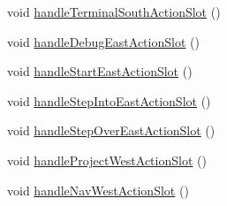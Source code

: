 \begin{DoxyCompactItemize}
\item 
void \hyperlink{class_master_actions_a3f3ec7277966d98a9fc5df5ceca1fa97}{handle\-Terminal\-South\-Action\-Slot} ()
\item 
void \hyperlink{class_master_actions_a03d0a4c989d63fd14f76ccda5893807b}{handle\-Debug\-East\-Action\-Slot} ()
\item 
void \hyperlink{class_master_actions_a24da37bce53aacd7de8d3643f273b1bd}{handle\-Start\-East\-Action\-Slot} ()
\item 
void \hyperlink{class_master_actions_a758cec03f958827f90c4393a8791e230}{handle\-Step\-Into\-East\-Action\-Slot} ()
\item 
void \hyperlink{class_master_actions_a1f222e4d7bbc9a445bc55383a79f78c1}{handle\-Step\-Over\-East\-Action\-Slot} ()
\item 
void \hyperlink{class_master_actions_a64bf020d68866c8941c01929879eb839}{handle\-Project\-West\-Action\-Slot} ()
\item 
void \hyperlink{class_master_actions_a15842bc0437410582285579f5820939a}{handle\-Nav\-West\-Action\-Slot} ()
\end{DoxyCompactItemize}
